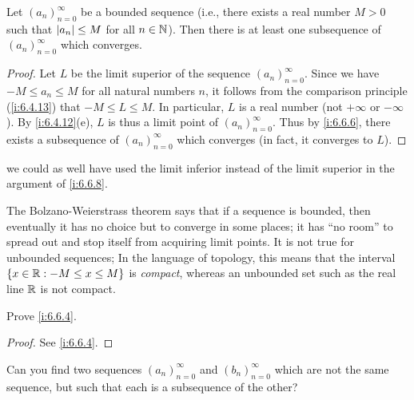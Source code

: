 \begin{thm}\label{i:6.6.8}
  Let \((a_n)_{n = 0}^\infty\) be a bounded sequence
  (i.e., there exists a real number \(M > 0\) such that \(\left\lvert a_n\right\rvert \leq M\) for all \(n \in \mathbb{N}\)).
  Then there is at least one subsequence of \((a_n)_{n = 0}^\infty\) which converges.
\end{thm}

\begin{proof}
  Let \(L\) be the limit superior of the sequence \((a_n)_{n = 0}^\infty\).
  Since we have \(-M \leq a_n \leq M\) for all natural numbers \(n\), it follows from the comparison principle (\cref{i:6.4.13}) that \(-M \leq L \leq M\).
  In particular, \(L\) is a real number (not \(+\infty\) or \(-\infty\)).
  By \cref{i:6.4.12}(e), \(L\) is thus a limit point of \((a_n)_{n = 0}^\infty\).
  Thus by \cref{i:6.6.6}, there exists a subsequence of \((a_n)_{n = 0}^\infty\) which converges
  (in fact, it converges to \(L\)).
\end{proof}

\begin{note}
  we could as well have used the limit inferior instead of the limit superior in the argument of \cref{i:6.6.8}.
\end{note}

\begin{rmk}\label{i:6.6.9}
  The Bolzano-Weierstrass theorem says that if a sequence is bounded, then eventually it has no choice but to converge in some places;
  it has ``no room'' to spread out and stop itself from acquiring limit points.
  It is not true for unbounded sequences;
  In the language of topology, this means that the interval \(\left\lbrace x \in \mathbb{R} : -M \leq x \leq M\right\rbrace\) is \emph{compact}, whereas an unbounded set such as the real line \(\mathbb{R}\) is not compact.
\end{rmk}

\exercisesection

\begin{ex}\label{i:ex:6.6.1}
  Prove \cref{i:6.6.4}.
\end{ex}

\begin{proof}
  See \cref{i:6.6.4}.
\end{proof}

\begin{ex}\label{i:ex:6.6.2}
  Can you find two sequences \((a_n)_{n = 0}^\infty\) and \((b_n)_{n = 0}^\infty\) which are not the same sequence, but such that each is a subsequence of the other?
\end{ex}

